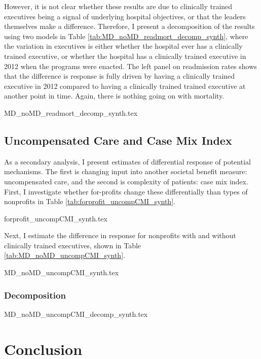 \documentclass[12pt]{article}
\begin{document}
    However, it is not clear whether these results are due to clinically trained executives being a signal of underlying hospital objectives, or that the leaders themselves make a difference. Therefore, I present a decomposition of the results using two models in Table \ref{tab:MD_noMD_readmort_decomp_synth}, where the variation in executives is either whether the hospital ever has a clinically trained executive, or whether the hospital has a clinically trained executive in 2012 when the programs were enacted. The left panel on readmission rates shows that the difference is response is fully driven by having a clinically trained executive in 2012 compared to having a clinically trained trained executive at another point in time. Again, there is nothing going on with mortality.  

    {MD_noMD_readmort_decomp_synth.tex}

     


    \subsection{Uncompensated Care and Case Mix Index}

    As a secondary analysis, I present estimates of differential response of potential mechanisms. The first is changing input into another societal benefit measure: uncompensated care, and the second is complexity of patients: case mix index. First, I investigate whether for-profits change these differentially than types of nonprofits in Table \ref{tab:forprofit_uncompCMI_synth}. 

    {forprofit_uncompCMI_synth.tex}

    Next, I estimate the difference in response for nonprofits with and without clinically trained executives, shown in Table \ref{tab:MD_noMD_uncompCMI_synth}. 

    {MD_noMD_uncompCMI_synth.tex}

    \subsubsection{Decomposition}

    {MD_noMD_uncompCMI_decomp_synth.tex}
    

    \section{Conclusion}
\end{document}
